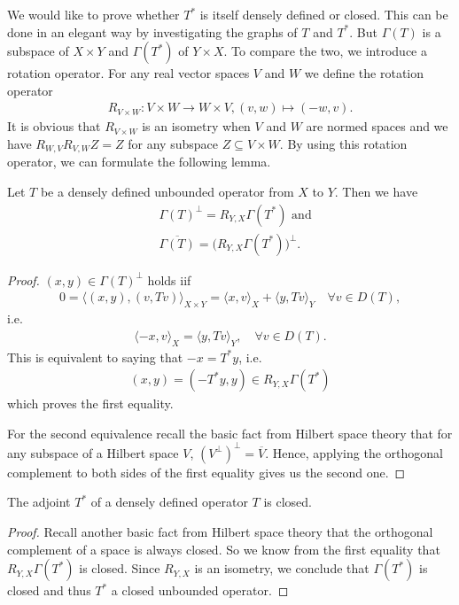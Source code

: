 \documentclass[../master_thesis.tex]{subfiles}
\begin{document}
We would like to prove whether $T^*$ is itself densely defined or closed. 
This can be done in an elegant way by investigating the graphs of $T$ and 
$T^*$. But $\Gamma(T)$ is a subspace of $X\times Y$ and 
$\Gamma(T^*)$ of $Y\times X$. To compare the two, we introduce a rotation operator. 
For any real vector spaces $V$ and $W$ we define the rotation operator 
\begin{align*}
    R_{V\times W}: V\times W \rightarrow W \times V, (v,w) \mapsto (-w,v).
\end{align*}
It is obvious that $R_{V\times W}$ is an isometry when $V$ and $W$ are normed spaces  
and we have $R_{W,V}R_{V,W}Z = Z$ for any subspace $Z\subseteq V\times W$.
By using this rotation operator, we can formulate the following lemma.
\begin{lemma}\label{lem:rotated_graph}
    Let $T$ be a densely defined unbounded operator from $X$ to $Y$. 
    Then we have 
    \begin{align*}
        & \Gamma(T)^\perp = R_{Y,X}\Gamma(T^*) \text{ and}
        \\ &\overline{\Gamma(T)} = \big(R_{Y,X}\Gamma(T^*)\big)^\perp.
    \end{align*}
\end{lemma}
\begin{proof}
    $(x,y) \in \Gamma(T)^\perp$ holds iif
    \begin{align*}
        0 = \langle (x,y), (v,Tv) \rangle _{X\times Y}
        = \langle x, v \rangle _X + \langle y, Tv \rangle _Y
            \quad \forall v \in D(T),
    \end{align*}
    i.e. 
    \begin{align*}
        \langle -x, v \rangle _X = \langle y, Tv \rangle _Y,
            \quad \forall v \in D(T).
    \end{align*}
    This is equivalent to saying that $-x = T^*y$, i.e.
    \begin{align*}
        (x,y) = (-T^*y,y) \in R_{Y,X}\Gamma(T^*)
    \end{align*}
    which proves the first equality.

    For the second equivalence recall the basic fact from Hilbert space theory
    that for any subspace of a Hilbert space $V$,
    $(V^\perp)^\perp = \overline{V}$. Hence, applying the orthogonal 
    complement to both sides of the first equality gives us the second one.
\end{proof}

\begin{corollary}\label{cor:adjoint_of_densely_defined}
    The adjoint $T^*$ of a densely defined operator $T$ is closed. 
\end{corollary}
\begin{proof}
    Recall another basic fact from Hilbert space theory that the 
    orthogonal complement of a space is always closed. 
    So we know from the first equality that $R_{Y,X}\Gamma(T^*)$ is closed.
    Since $R_{Y,X}$ is an isometry, we conclude that $\Gamma(T^*)$ is closed and 
    thus $T^*$ a closed unbounded operator.
\end{proof}
\end{document}

